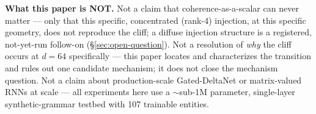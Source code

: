 \textbf{What this paper is NOT.} Not a claim that coherence-as-a-scalar can
never matter --- only that this specific, concentrated (rank-4) injection,
at this specific geometry, does not reproduce the cliff; a diffuse
injection structure is a registered, not-yet-run follow-on
(\S\ref{sec:open-question}). Not a resolution of \emph{why} the cliff
occurs at $d=64$ specifically --- this paper locates and characterizes the
transition and rules out one candidate mechanism; it does not close the
mechanism question. Not a claim about production-scale Gated-DeltaNet
\citep{siems2025deltaproduct, grazzi2025negative} or matrix-valued RNNs at
scale \citep{mishra2026m2rnn} --- all experiments here use a $\sim$sub-1M
parameter, single-layer synthetic-grammar testbed with 107 trainable
entities.
